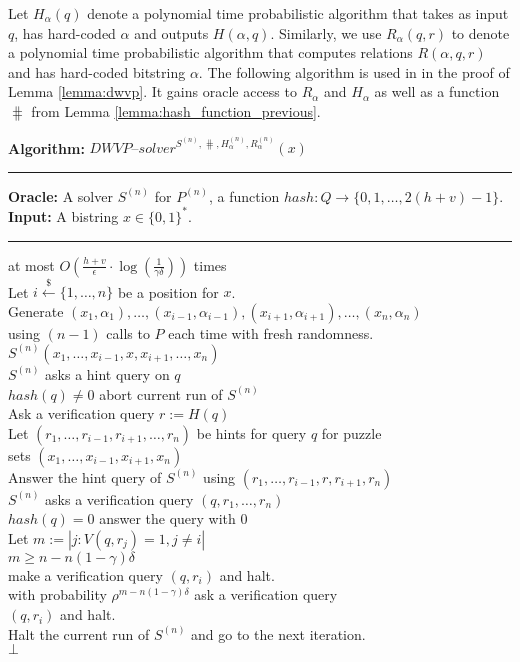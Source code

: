 Let $H_{\alpha}(q)$ denote a polynomial time probabilistic algorithm that takes as input $q$,
has hard-coded $\alpha$ and outputs $H(\alpha, q)$.
Similarly, we use $R_{\alpha}(q,r)$ to denote a polynomial time probabilistic algorithm that computes relations
$R(\alpha, q, r)$ and has hard-coded bitstring $\alpha$.
The following algorithm is used in \cite{Dodis:2009:SAI:1530441.1530450} in the proof of Lemma \ref{lemma:dwvp}.
It gains oracle access to $R_{\alpha}$ and $H_{\alpha}$ as well as a function $\hash$ from Lemma \ref{lemma:hash_function_previous}.
%
\begin{codeblock}
  \textbf{Algorithm:} $\mathit{DWVP\text{--}solver}^{S^{(n)}, \hash, H_{\alpha}^{(n)}, R_{\alpha}^{(n)}}(x)$
  \medskip
  \hrule
  \textbf{Oracle:}  A solver $S^{(n)}$ for $P^{(n)}$, a function $hash : Q \rightarrow \{0,1, \dotsc, 2(h+v)-1\}$.\\
  \textbf{Input:} A bistring $x \in \{0,1\}^{*}$.
  \medskip\hrule
  \Repeat at most $O(\frac{h+v}{\epsilon} \cdot \log(\frac{1}{\gamma\delta}))$ times \\
  \IndI Let $i \xleftarrow{\$} \{1, \dotsc, n\}$ be a position for $x$.\\
  \IndI Generate $(x_1, \alpha_1), \dotsc, (x_{i-1}, \alpha_{i-1}), (x_{i+1}, \alpha_{i+1}), \dotsc, (x_n, \alpha_n)$ \\
  \IndI using $(n-1)$ calls to $P$ each time with fresh randomness.\\
  \IndI \Run $S^{(n)}(x_1, \dotsc, x_{i-1}, x, x_{i+1}, \dotsc, x_n)$\\
  \IndII \If $S^{(n)}$ asks a hint query on $q$ \Then \\
  \IndIII \If $hash(q) \neq 0$ \Then abort current run of $S^{(n)}$\\
  \IndIII Ask a verification query $r := H(q)$\\
  \IndIII Let $(r_1, \dotsc, r_{i-1}, r_{i+1}, \dotsc, r_{n})$ be hints for query $q$ for puzzle\\
  \IndIII sets $(x_1, \dotsc, x_{i-1}, x_{i+1}, x_n)$\\
  \IndIII Answer the hint query of $S^{(n)}$ using $(r_1, \dots, r_{i-1}, r, r_{i+1}, r_n)$\\
  \IndII \If $S^{(n)}$ asks a verification query $(q, r_1, \dots, r_n)$ \Then \\
  \IndIII \If $hash(q) = 0$ \Then answer the query with $0$\\
  \IndIII Let $m := |j: V(q,r_j) = 1, j \neq i|$\\
  \IndIII \If $m \geq n - n(1-\gamma)\delta$ \Then \\
  \IndIIII make a verification query $(q, r_i)$ and halt.\\
  \IndIII \Else with probability $\rho^{m - n(1-\gamma)\delta}$ ask a verification query \\
  \IndIIII $(q, r_i)$ and halt. \\
  \IndIII Halt the current run of $S^{(n)}$ and go to the next iteration.\\
  \Return $\bot$
\end{codeblock}

